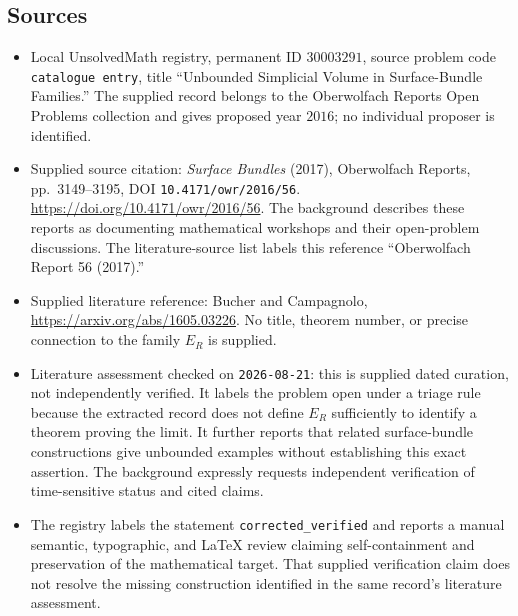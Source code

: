 \documentclass[11pt]{article}
\begin{document}
\subsection{Sources}
\begin{itemize}
\item Local UnsolvedMath registry, permanent ID \(30003291\), source problem code \texttt{catalogue entry}, title ``Unbounded Simplicial Volume in Surface-Bundle Families.'' The supplied record belongs to the Oberwolfach Reports Open Problems collection and gives proposed year \(2016\); no individual proposer is identified.
\item Supplied source citation: \emph{Surface Bundles} (2017), Oberwolfach Reports, pp.\ 3149--3195, DOI \texttt{10.4171/owr/2016/56}. \url{https://doi.org/10.4171/owr/2016/56}. The background describes these reports as documenting mathematical workshops and their open-problem discussions. The literature-source list labels this reference ``Oberwolfach Report 56 (2017).''
\item Supplied literature reference: Bucher and Campagnolo, \url{https://arxiv.org/abs/1605.03226}. No title, theorem number, or precise connection to the family \(E_R\) is supplied.
\item Literature assessment checked on \texttt{2026-08-21}: this is supplied dated curation, not independently verified. It labels the problem open under a triage rule because the extracted record does not define \(E_R\) sufficiently to identify a theorem proving the limit. It further reports that related surface-bundle constructions give unbounded examples without establishing this exact assertion. The background expressly requests independent verification of time-sensitive status and cited claims.
\item The registry labels the statement \texttt{corrected\_verified} and reports a manual semantic, typographic, and LaTeX review claiming self-containment and preservation of the mathematical target. That supplied verification claim does not resolve the missing construction identified in the same record's literature assessment.
\end{itemize}
\end{document}
